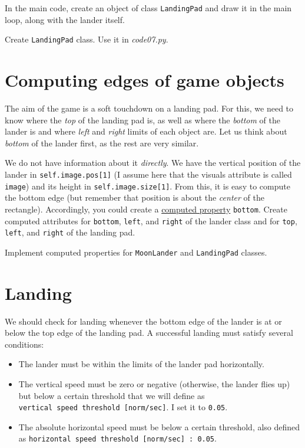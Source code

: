 \documentclass[
]{book}
\providecommand{\tightlist}{%
  \setlength{\itemsep}{0pt}\setlength{\parskip}{0pt}}
\begin{document}
In the main code, create an object of class \texttt{LandingPad} and draw it in the main loop, along with the lander itself.

Create \texttt{LandingPad} class.
Use it in \emph{code07.py}.

\hypertarget{computing-edges-of-game-objects}{%
\section{Computing edges of game objects}\label{computing-edges-of-game-objects}}

The aim of the game is a soft touchdown on a landing pad. For this, we need to know where the \emph{top} of the landing pad is, as well as where the \emph{bottom} of the lander is and where \emph{left} and \emph{right} limits of each object are. Let us think about \emph{bottom} of the lander first, as the rest are very similar.

We do not have information about it \emph{directly}. We have the vertical position of the lander in \texttt{self.image.pos{[}1{]}} (I assume here that the visuals attribute is called \texttt{image}) and its height in \texttt{self.image.size{[}1{]}}. From this, it is easy to compute the bottom edge (but remember that position is about the \emph{center} of the rectangle). Accordingly, you could create a \protect\hyperlink{computed-attribute-property}{computed property} \texttt{bottom}. Create computed attributes for \texttt{bottom}, \texttt{left}, and \texttt{right} of the lander class and for \texttt{top}, \texttt{left}, and \texttt{right} of the landing pad.

Implement computed properties for \texttt{MoonLander} and \texttt{LandingPad} classes.

\hypertarget{landing}{%
\section{Landing}\label{landing}}

We should check for landing whenever the bottom edge of the lander is at or below the top edge of the landing pad. A successful landing must satisfy several conditions:

\begin{itemize}
\tightlist
\item
  The lander must be within the limits of the lander pad horizontally.
\item
  The vertical speed must be zero or negative (otherwise, the lander flies up) but below a certain threshold that we will define as \texttt{vertical\ speed\ threshold\ {[}norm/sec{]}}. I set it to \texttt{0.05}.
\item
  The absolute horizontal speed must be below a certain threshold, also defined as \texttt{horizontal\ speed\ threshold\ {[}norm/sec{]}\ :\ 0.05}.
\end{itemize}
\end{document}
